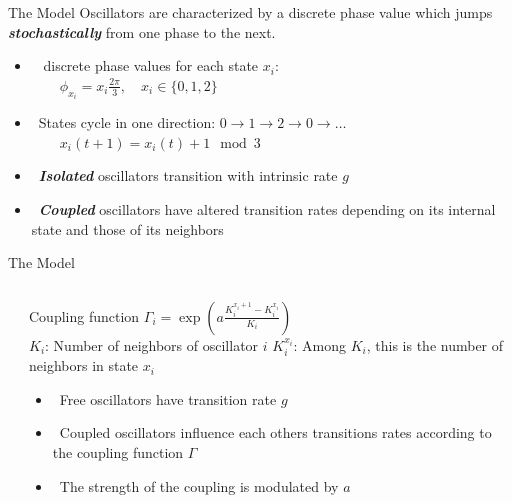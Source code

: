 \documentclass[serif,mathserif]{beamer}
\begin{document}
\begin{frame}{The Model}
    Oscillators are characterized by a discrete phase value which jumps \textbf{\textit{stochastically}} from one phase to the next.
    \begin{itemize}
        \vspace{0.25cm}
        \item \  discrete phase values for each state $x_i$: \\
        $\qquad \phi_{x_i} = x_i\frac{2\pi}{3}, \quad x_i \in \{0,1,2\}$
        \vspace{0.25cm}
        \item \ \pause States cycle in one direction: $0 \rightarrow 1 \rightarrow 2 \rightarrow 0 \rightarrow \dots$ \\
            $\qquad x_i(t+1) = x_i(t) + 1 \mod 3$
        \vspace{0.25cm}
        \item \ \pause \textbf{\textit{Isolated}} oscillators transition with intrinsic rate $g$
        \vspace{0.25cm}
        \item \ \pause \textbf{\textit{Coupled}} oscillators have altered transition rates depending on its internal state and those of its neighbors
    \end{itemize}
\end{frame}

\begin{frame}{The Model}
    \begin{columns}[t]
        \begin{column}{0.5\textwidth}
            \centering
        \end{column}
        \begin{column}{0.6\textwidth}
            Coupling function $\Gamma_i = \exp \left( a \frac{K_i^{x_i + 1} - K_i^{x_i}}{K_i} \right)$ \\
            $K_{i}$: Number of neighbors of oscillator $i$
            $K_i^{x_i}$: Among $K_i$, this is the number of neighbors in state $x_i$ \\
            \begin{itemize}
                \vspace{0.25cm}
                \item \ \pause Free oscillators have transition rate $g$
                \vspace{0.25cm}
                \item \ \pause Coupled oscillators influence each others transitions rates according to the coupling function $\Gamma$
                \vspace{0.25cm}
                \item \ \pause The strength of the coupling is modulated by $a$
            \end{itemize}
        \end{column}
    \end{columns}
\end{frame}
\end{document}
